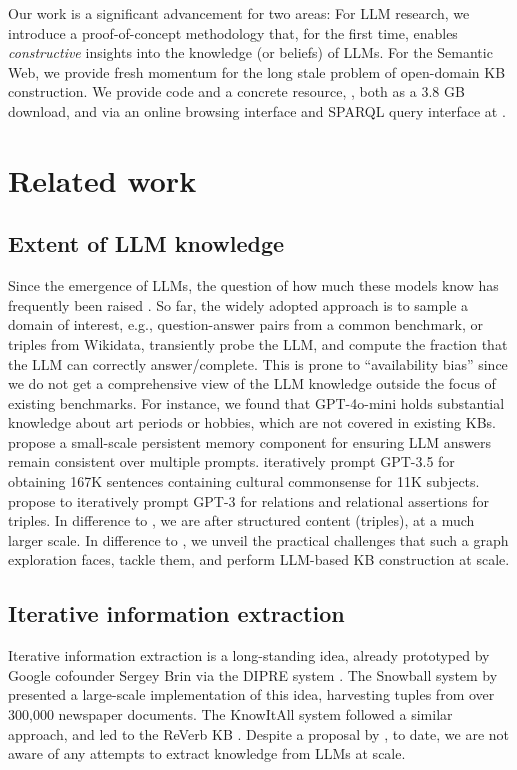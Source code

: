 Our work is a significant advancement for two 
areas:
For 
LLM research,
we introduce a proof-of-concept methodology that, for the first time, enables \textit{constructive} insights into the knowledge (or beliefs) of LLMs.
For 
the Semantic Web,
we provide fresh momentum for the long stale problem of open-domain KB construction. 
We provide code and a concrete resource, \ourkb, both as a 3.8 GB download, and via an online browsing interface and SPARQL query interface at \website.
    


\chapter{Related work}

\section{Extent of LLM knowledge}
Since the emergence of LLMs, the question of how much these models know has frequently been raised \cite{petroni-etal-2019-language,roberts-etal-2020-much,jiang-etal-2020-know,veseli2023evaluating,sun-etal-2024-head,wu2024towards}.
So far, the widely adopted approach is to sample a domain of interest, e.g., question-answer pairs from a common benchmark, or triples from Wikidata, transiently probe the LLM, and compute the fraction that the LLM can correctly answer/complete. 
This is prone to ``availability bias'' \cite{kahnemann} since we do not get a comprehensive view of the LLM knowledge outside the focus of existing benchmarks.
For instance, we found that GPT-4o-mini holds substantial knowledge about art periods or hobbies, which are not covered in existing KBs.
\citet{kassner-etal-2021-beliefbank} propose a small-scale persistent memory component for ensuring LLM answers remain consistent over multiple prompts.
\citet{mango} iteratively prompt GPT-3.5 for obtaining 167K sentences containing cultural commonsense for 11K subjects. \citet{cohen-etal-2023-crawling} propose to iteratively prompt GPT-3 for relations and relational assertions for triples.
In difference to \cite{mango}, we are after structured content (triples), at a much larger scale. In difference to \cite{cohen-etal-2023-crawling}, we unveil the practical challenges that such a graph exploration faces, tackle them, and perform LLM-based KB construction at scale.

\section{Iterative information extraction}
Iterative information extraction is a long-standing idea, already prototyped by Google cofounder Sergey Brin via the DIPRE system \cite{brin1998extracting}. The Snowball system by \citet{agichtein2000snowball} presented a large-scale implementation of this idea, harvesting tuples from over 300,000 newspaper documents. The KnowItAll system \cite{etzioni2004web} followed a similar approach, and led to the ReVerb KB \cite{reverb}. Despite a proposal by \cite{cohen-etal-2023-crawling}, to date, we are not aware of any attempts to extract knowledge from LLMs at scale.




